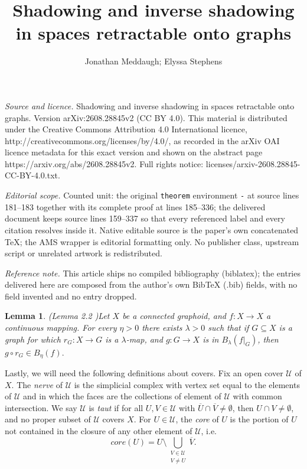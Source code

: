 \documentclass[10pt,a4paper]{amsart}
\newtheorem{lemma}[theorem]{Lemma}
\numberwithin{equation}{section}
\begin{document}
\title[Shadowing and inverse shadowing in spaces retractable onto g]{Shadowing and inverse shadowing in spaces retractable onto graphs}
\author{Jonathan Meddaugh; Elyssa Stephens}
\date{}
\maketitle
\noindent\emph{Source and licence.} Shadowing and inverse shadowing in spaces retractable onto graphs. Version arXiv:2608.28845v2 (CC BY 4.0). This material is distributed under the Creative Commons Attribution 4.0 International licence, http://creativecommons.org/licenses/by/4.0/, as recorded in the arXiv OAI licence metadata for this exact version and shown on the abstract page https://arxiv.org/abs/2608.28845v2. Full rights notice: licenses/arxiv-2608.28845-CC-BY-4.0.txt.\par\smallskip
\noindent\textit{Editorial scope.} Counted unit: the original \texttt{theorem} environment \texttt{-} at source lines 181--183 together with its complete proof at lines 185--336; the delivered document keeps source lines 159--337 so that every referenced label and every citation resolves inside it. Native editable source is the paper's own concatenated TeX; the AMS wrapper is editorial formatting only. No publisher class, upstream script or unrelated artwork is redistributed.
\par\smallskip\noindent\textit{Reference note.} This article ships no compiled bibliography (biblatex); the entries delivered here are composed from the author's own BibTeX (.bib) fields, with no field invented and no entry dropped.
\begin{lemma}{(Lemma 2.2 \cite{genericshadowingmeddaugh})}\label{graphoidlemma22}
Let $X$ be a connected graphoid, and $f:X\to X$ a continuous mapping. For every $\eta >0$ there exists $\lambda>0$ such that if $G\subseteq X$ is a graph for which $r_G: X\to G$ is a $\lambda$-map, and $g:G \to X$ is in $B_\lambda(f|_G)$, then $g\circ r_G\in B_\eta(f).$
\end{lemma}


Lastly, we will need the following definitions about covers. Fix an open cover $\mathcal{U}$ of $X$. The \emph{nerve} of $\mathcal{U}$ is the simplicial complex with vertex set equal to the elements of $\mathcal{U}$ and in which the faces are the collections of element of $\mathcal{U}$ with common intersection. We say $\mathcal{U}$ is \emph{taut} if for all $U,V\in \mathcal{U}$ with $\overline{U}\cap\overline{V}\neq \emptyset$, then $U\cap V\neq \emptyset$, and no proper subset of $\mathcal{U}$ covers $X$. For $U\in \mathcal{U}$, the \emph{core} of $U$ is the portion of $U$ not contained in the closure of any other element of $\mathcal U$, i.e.\[core(U)=U\setminus \displaystyle\bigcup_{\substack{V\in \mathcal{U}\\ V\neq U}}\overline{V}.\]
\end{document}
